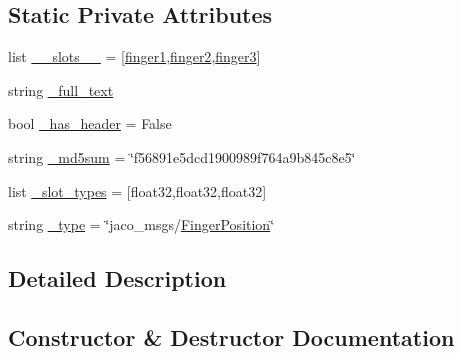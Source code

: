 \subsection*{Static Private Attributes}
\begin{DoxyCompactItemize}
\item 
list \hyperlink{classjaco__msgs_1_1msg_1_1__FingerPosition_1_1FingerPosition_a79fe00a15da123ed76c12e8bc1f16bd7}{\+\_\+\+\_\+slots\+\_\+\+\_\+} = \mbox{[}\textquotesingle{}\hyperlink{classjaco__msgs_1_1msg_1_1__FingerPosition_1_1FingerPosition_a430ef099e85b82ce1a61235bd0496ff5}{finger1}\textquotesingle{},\textquotesingle{}\hyperlink{classjaco__msgs_1_1msg_1_1__FingerPosition_1_1FingerPosition_a1d275302f5906a117122394553b0d533}{finger2}\textquotesingle{},\textquotesingle{}\hyperlink{classjaco__msgs_1_1msg_1_1__FingerPosition_1_1FingerPosition_ae22eef5355a658212ddb6b748780e72f}{finger3}\textquotesingle{}\mbox{]}
\item 
string \hyperlink{classjaco__msgs_1_1msg_1_1__FingerPosition_1_1FingerPosition_ae7cadffecf79169f21b7ccb59e12a45f}{\+\_\+full\+\_\+text}
\item 
bool \hyperlink{classjaco__msgs_1_1msg_1_1__FingerPosition_1_1FingerPosition_a4dca820040ec271e4a3aa926e49b7669}{\+\_\+has\+\_\+header} = False
\item 
string \hyperlink{classjaco__msgs_1_1msg_1_1__FingerPosition_1_1FingerPosition_a00418419cdbb4cc150f6d2e881b642c1}{\+\_\+md5sum} = \char`\"{}f56891e5dcd1900989f764a9b845c8e5\char`\"{}
\item 
list \hyperlink{classjaco__msgs_1_1msg_1_1__FingerPosition_1_1FingerPosition_a8a3a8d68617adfaaadf13c6fa6aecdeb}{\+\_\+slot\+\_\+types} = \mbox{[}\textquotesingle{}float32\textquotesingle{},\textquotesingle{}float32\textquotesingle{},\textquotesingle{}float32\textquotesingle{}\mbox{]}
\item 
string \hyperlink{classjaco__msgs_1_1msg_1_1__FingerPosition_1_1FingerPosition_a23b86eed10a1ea8b7cf365583f2a8486}{\+\_\+type} = \char`\"{}jaco\+\_\+msgs/\hyperlink{classjaco__msgs_1_1msg_1_1__FingerPosition_1_1FingerPosition}{Finger\+Position}\char`\"{}
\end{DoxyCompactItemize}


\subsection{Detailed Description}


\subsection{Constructor \& Destructor Documentation}
